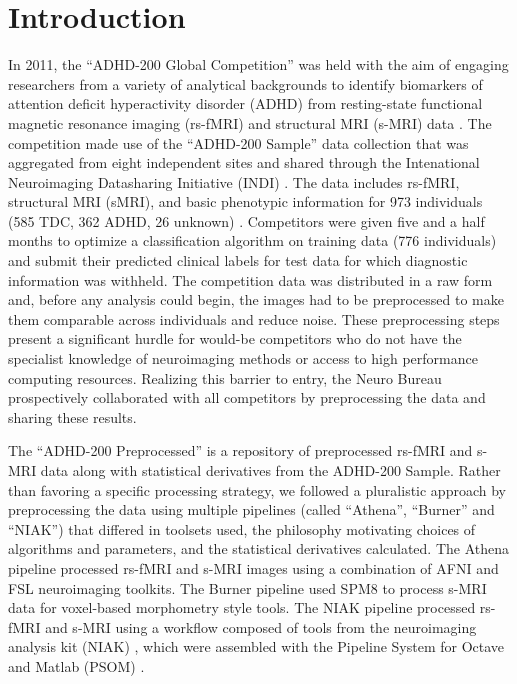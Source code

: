 \documentclass[preprint,12pt,3p]{elsarticle}
\begin{document}
\section{Introduction}

In 2011, the ``ADHD-200 Global Competition'' was held with the aim of engaging researchers from a variety of analytical backgrounds to identify biomarkers of attention deficit hyperactivity disorder (ADHD) from resting-state functional magnetic resonance imaging (rs-fMRI) and structural MRI (s-MRI) data \cite{Milham2012}. The competition made use of the ``ADHD-200 Sample'' data collection that was aggregated from eight independent sites and shared through the Intenational Neuroimaging Datasharing Initiative (INDI) \cite{Mennes2013}. The data includes rs-fMRI, structural MRI (sMRI), and basic phenotypic information for 973 individuals (585 TDC, 362 ADHD, 26 unknown) \cite{Milham2012}. Competitors were given five and a half months to optimize a classification algorithm on training data (776 individuals) and submit their predicted clinical labels for test data for which diagnostic information was withheld. The competition data was distributed in a raw form and, before any analysis could begin, the images had to be preprocessed to make them comparable across individuals and reduce noise. These preprocessing steps present a significant hurdle for would-be competitors who do not have the specialist knowledge of neuroimaging methods or access to high performance computing resources. Realizing this barrier to entry, the Neuro Bureau prospectively collaborated with all competitors by preprocessing the data and sharing these results.

The ``ADHD-200 Preprocessed'' is a repository of preprocessed rs-fMRI and s-MRI data along with statistical derivatives from the ADHD-200 Sample. Rather than favoring a specific processing strategy, we followed a pluralistic approach by preprocessing the data using multiple pipelines (called ``Athena'', ``Burner'' and ``NIAK'') that differed in toolsets used, the philosophy motivating choices of algorithms and parameters, and the statistical derivatives calculated. The Athena pipeline processed rs-fMRI and s-MRI images using a combination of AFNI \cite{cox1996afni} and FSL \cite{smith2004advances} neuroimaging toolkits. The Burner pipeline used SPM8 \cite{ashburner2012spm8} to process s-MRI data for voxel-based morphometry style tools. The NIAK pipeline processed rs-fMRI and s-MRI using a workflow composed of tools from the neuroimaging analysis kit (NIAK) \cite{Bellec2011}, which were assembled with the Pipeline System for Octave and Matlab (PSOM) \cite{Bellec2012}. 
\end{document}
